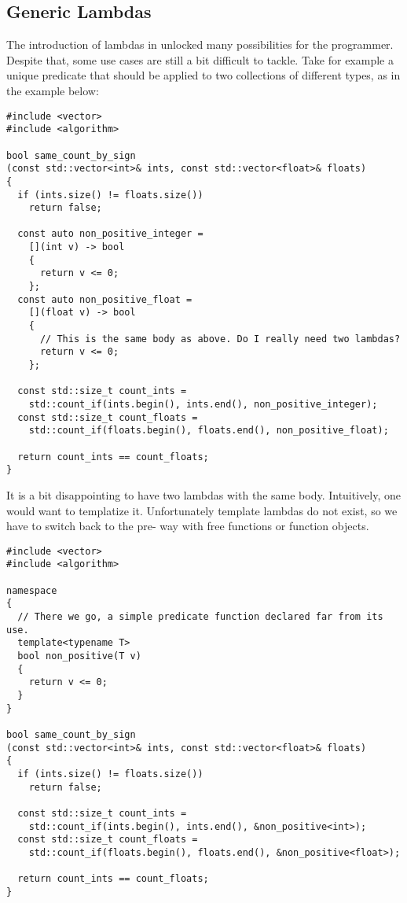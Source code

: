 \subsection{Generic Lambdas}

The introduction of lambdas  in  unlocked many
possibilities for the programmer. Despite that, some use cases are
still a bit difficult to tackle. Take for example a unique predicate
that should be applied to two collections of different types, as in
the example below:

\begin{lstlisting}
#include <vector>
#include <algorithm>

bool same_count_by_sign
(const std::vector<int>& ints, const std::vector<float>& floats)
{
  if (ints.size() != floats.size())
    return false;

  const auto non_positive_integer =
    [](int v) -> bool
    {
      return v <= 0;
    };
  const auto non_positive_float =
    [](float v) -> bool
    {
      // This is the same body as above. Do I really need two lambdas?
      return v <= 0;
    };

  const std::size_t count_ints =
    std::count_if(ints.begin(), ints.end(), non_positive_integer);
  const std::size_t count_floats =
    std::count_if(floats.begin(), floats.end(), non_positive_float);

  return count_ints == count_floats;
}
\end{lstlisting}

It is a bit disappointing to have two lambdas with the same
body. Intuitively, one would want to templatize it. Unfortunately
template lambdas do not exist, so we have to switch back to the
pre- way with free functions or function objects.

\begin{lstlisting}
#include <vector>
#include <algorithm>

namespace
{
  // There we go, a simple predicate function declared far from its use.
  template<typename T>
  bool non_positive(T v)
  {
    return v <= 0;
  }
}

bool same_count_by_sign
(const std::vector<int>& ints, const std::vector<float>& floats)
{
  if (ints.size() != floats.size())
    return false;

  const std::size_t count_ints =
    std::count_if(ints.begin(), ints.end(), &non_positive<int>);
  const std::size_t count_floats =
    std::count_if(floats.begin(), floats.end(), &non_positive<float>);

  return count_ints == count_floats;
}
\end{lstlisting}

